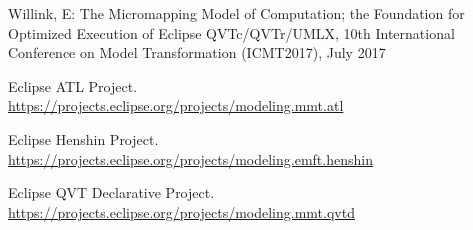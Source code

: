 \documentclass{llncs}
\begin{document}
\begin{thebibliography}{}
Willink, E: The Micromapping Model of Computation; the Foundation for Optimized Execution of Eclipse QVTc/QVTr/UMLX, 10th International Conference on Model Transformation (ICMT2017), July 2017

Eclipse ATL Project.\\
\url{https://projects.eclipse.org/projects/modeling.mmt.atl}

Eclipse Henshin Project.\\
\url{https://projects.eclipse.org/projects/modeling.emft.henshin}

Eclipse QVT Declarative Project.\\
\url{https://projects.eclipse.org/projects/modeling.mmt.qvtd}

\end{thebibliography}
\end{document}
